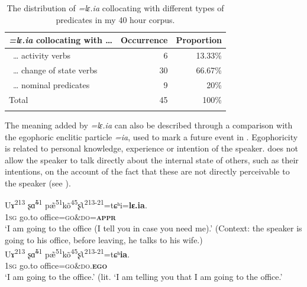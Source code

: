 \documentclass[output=paper,colorlinks,citecolor=brown, language=chinese]{langscibook}
\begin{document}
\begin{table}

%
\begin{tabularx}{\textwidth}{Q rr}
\lsptoprule
\textit{=lɛ.ia} collocating with \ldots& Occurrence & Proportion \\
\midrule
~… activity verbs        & 6        & 13.33\% \\
~… change of state verbs & 30       & 66.67\% \\
~… nominal predicates    & 9        & 20\%    \\
\midrule
Total                 & 45       & 100\%   \\
\lspbottomrule
\end{tabularx}

%
\caption{The distribution of \textit{=lɛ.ia} collocating with different types of predicates in my 40 hour corpus.}
\label{tab:song:3}
\end{table}

The meaning added by \textit{=lɛ.ia} can also be described through a comparison with the egophoric enclitic particle \textit{=ia}, used to mark a future event in . Egophoricity is related to personal knowledge, experience or intention of the speaker.  does not allow the speaker to talk directly about the internal state of others, such as their intentions, on the account of the fact that these are not directly perceivable to the speaker (see \cite{Song2019}).


\ea \label{ex:Song23}
\ea \label{ex:Song23a}
\gll Uɤ\textsuperscript{213} ʂ\~ɑ\textsuperscript{51} p\~æ\textsuperscript{51}k\~o\textsuperscript{45}ʂʅ\textsuperscript{213-21}=tɕʰi=\textbf{lɛ.ia}. \\
\textsc{1sg} go.to office=\textsc{go\&do=\textbf{appr}} \\
\glt `I am going to the office (I tell you in case you need me).' (Context: the speaker is going to his office, before leaving, he talks to his wife.) \\
\ex \label{ex:Song23b}
\gll Uɤ\textsuperscript{213} ʂ\~ɑ\textsuperscript{51} p\~æ\textsuperscript{51}k\~o\textsuperscript{45}ʂʅ\textsuperscript{213-21}=tɕʰ\textbf{ia}. \\
\textsc{1sg} go.to office=\textsc{go\&do.\textbf{ego}} \\
\glt `I am going to the office.' (lit. `I am telling you that I am going to the office.'
\z
\z
\end{document}
